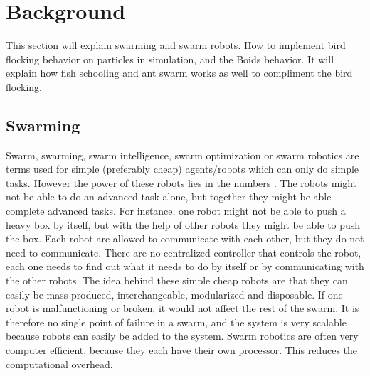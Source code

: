 \section{Background}
\label{sec:background}
This section will explain swarming and swarm robots. How to implement bird flocking behavior on particles in simulation, and the Boids behavior. It will explain how fish schooling and ant swarm works as well to compliment the bird flocking.

\subsection{Swarming}
Swarm, swarming, swarm intelligence, swarm optimization or swarm robotics are terms used for simple (preferably cheap) agents/robots which can only do simple tasks. However the power of these robots lies in the numbers \citep{Zhu2010,Bonabeau1999}. The robots might not be able to do an advanced task alone, but together they might be able complete advanced tasks. For instance, one robot might not be able to push a heavy box by itself, but with the help of other robots they might be able to push the box.
Each robot are allowed to communicate with each other, but they do not need to communicate. There are no centralized controller that controls the robot, each one needs to find out what it needs to do by itself or by communicating with the other robots. The idea behind these simple cheap robots are that they can easily be mass produced, interchangeable, modularized and disposable. If one robot is malfunctioning or broken, it would not affect the rest of the swarm. It is therefore no single point of failure in a swarm, and the system is very scalable because robots can easily be added to the system.
Swarm robotics are often very computer efficient, because they each have their own processor. This reduces the computational overhead. 

